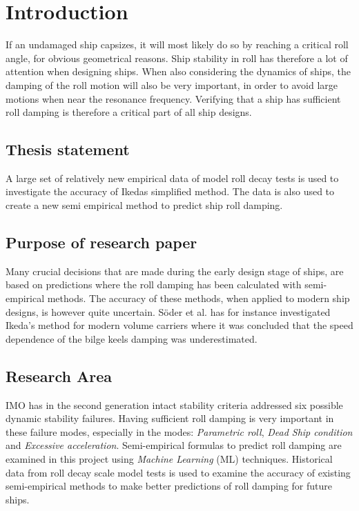 \section{Introduction}
\label{se:introduction}
If an undamaged ship capsizes, it will most likely do so by reaching a critical roll angle, for obvious geometrical reasons. Ship stability in roll has therefore a lot of attention when designing ships. When also considering the dynamics of ships, the damping of the roll motion will also be very important, in order to avoid large motions when near the resonance frequency. Verifying that a ship has sufficient roll damping is therefore a critical part of all ship designs.

\subsection{Thesis statement}
A large set of relatively new empirical data of model roll decay tests is used to investigate the accuracy of Ikedas simplified method. The data is also used to create a new semi empirical method to predict ship roll damping.

\subsection{Purpose of research paper}
Many crucial decisions that are made during the early design stage of ships, are based on predictions where the roll damping has been calculated with semi-empirical methods. The accuracy of these methods, when applied to modern ship designs, is however quite uncertain. Söder et al. \cite{soder_ikeda_2019} has for instance investigated Ikeda’s method for modern volume carriers where it was concluded that the speed dependence of the bilge keels damping was underestimated.


\subsection{Research Area}
IMO has in the second generation intact stability criteria \cite{imo_second_nodate} addressed six possible dynamic stability failures. Having sufficient roll damping is very important in these failure modes, especially in the modes: \emph{Parametric roll}, \emph{Dead Ship condition} and \emph{Excessive acceleration}. Semi-empirical formulas to predict roll damping are examined in this project using \emph{Machine Learning} (ML) techniques. Historical data from roll decay scale model tests is used to examine the accuracy of existing semi-empirical methods to make better predictions of roll damping for future ships.


